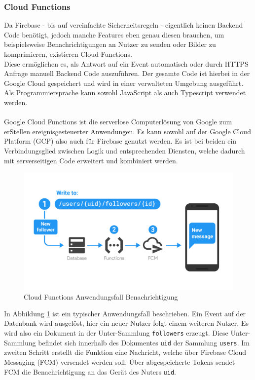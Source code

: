 \subsubsection{Cloud Functions}
\label{sec:cloudfunctions}
Da Firebase - bis auf vereinfachte Sicherheitsregeln - eigentlich keinen Backend Code benötigt, jedoch manche Features eben genau diesen brauchen, um beispielsweise Benachrichtigungen an Nutzer zu senden oder Bilder zu komprimieren, existieren Cloud Functions.\\
Diese ermöglichen es, als Antwort auf ein Event automatisch oder durch HTTPS Anfrage manuell Backend Code auszuführen.
Der gesamte Code ist hierbei in der Google Cloud gespeichert und wird in einer verwalteten Umgebung ausgeführt.
Als Programmiersprache kann sowohl JavaScript als auch Typescript verwendet werden.\\
\\
\glqq Google Cloud Functions ist die serverlose Computerlösung von Google zum erStellen ereignisgesteuerter Anwendungen.\grqq \cite{firebase2021} 
Es kann sowohl auf der Google Cloud Platform (GCP) also auch für Firebase genutzt werden. 
Es ist bei beiden ein Verbindungsglied zwischen Logik und entsprechenden Diensten, welche dadurch mit serverseitigen Code erweitert und kombiniert werden.
\begin{figure}[htb]
	\begin{center}
		\includegraphics[scale=0.2]{Theoretische_Grundlagen/images/firebase_functions_notify.png}
	\end{center}
	\caption{Cloud Functions Anwendungsfall Benachrichtigung}
	\label{fig:functions_notifications}
\end{figure}
In Abbildung \ref{fig:functions_notifications} ist ein typischer Anwendungsfall beschrieben. 
Ein Event auf der Datenbank wird ausgelöst, hier ein neuer Nutzer folgt einem weiteren Nutzer.
Es wird also ein Dokument in der Unter-Sammlung \texttt{followers} erzeugt. Diese Unter-Sammlung befindet sich innerhalb des Dokumentes \texttt{uid} der Sammlung \texttt{users}.
Im zweiten Schritt erstellt die Funktion eine Nachricht, welche über Firebase Cloud Messaging (FCM) versendet werden soll.
Über abgespeicherte Tokens sendet FCM die Benachrichtigung an das Gerät des Nuters \texttt{uid}.\cite{firebase2021}

